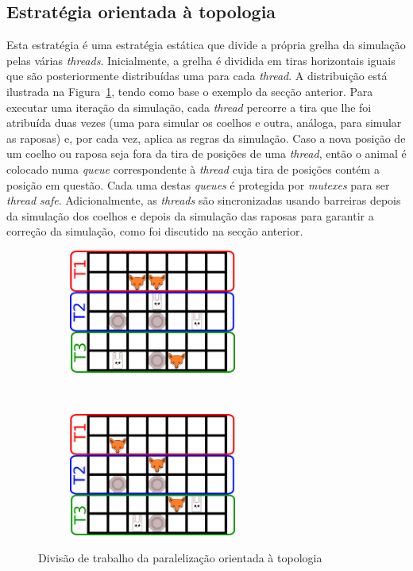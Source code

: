 \documentclass[10pt,a4paper,oneside]{article}
\begin{document}
\subsection{Estratégia orientada à topologia}
Esta estratégia é uma estratégia estática que divide a própria grelha
da simulação pelas várias \textit{threads}. Inicialmente, a grelha é
dividida em tiras horizontais iguais que são posteriormente
distribuídas uma para cada \textit{thread}. A distribuição está
ilustrada na Figura~\ref{fig:par1}, tendo como base o exemplo da
secção anterior. Para executar uma iteração da simulação, cada
\textit{thread} percorre a tira que lhe foi atribuída duas vezes (uma
para simular os coelhos e outra, análoga, para simular as raposas) e,
por cada vez, aplica as regras da simulação. Caso a nova posição de um
coelho ou raposa seja fora da tira de posições de uma \textit{thread},
então o animal é colocado numa \textit{queue} correspondente à
\textit{thread} cuja tira de posições contém a posição em
questão. Cada uma destas \textit{queues} é protegida por
\textit{mutexes} para ser \textit{thread safe}. Adicionalmente, as
\textit{threads} são sincronizadas usando barreiras depois da
simulação dos coelhos e depois da simulação das raposas para garantir
a correção da simulação, como foi discutido na secção anterior.

\begin{figure}[H]
    \centering
    \begin{subfigure}[b]{0.4\textwidth}
      \centering
      \includegraphics[height=1.6in]{grid1_par1.png}
    \end{subfigure}
    ~
    \begin{subfigure}[b]{0.4\textwidth}
      \centering
      \includegraphics[height=1.6in]{grid2_par1.png}
    \end{subfigure}
    \caption{Divisão de trabalho da paralelização orientada à topologia}
    \label{fig:par1}
\end{figure}
\end{document}
